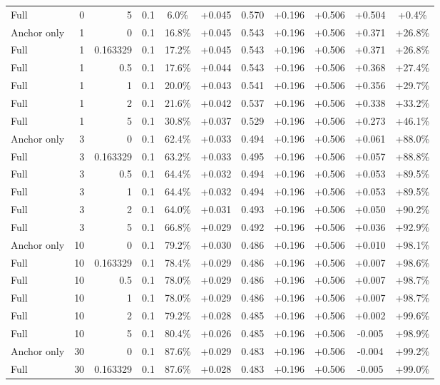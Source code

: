 \begin{table}[htbp]
\begin{tabular}{lrrrccccccc}
Full & 0 & 5 & 0.1 & 6.0\% & +0.045 & 0.570 & +0.196 & +0.506 & +0.504 & +0.4\% \\
Anchor only & 1 & 0 & 0.1 & 16.8\% & +0.045 & 0.543 & +0.196 & +0.506 & +0.371 & +26.8\% \\
Full & 1 & 0.163329 & 0.1 & 17.2\% & +0.045 & 0.543 & +0.196 & +0.506 & +0.371 & +26.8\% \\
Full & 1 & 0.5 & 0.1 & 17.6\% & +0.044 & 0.543 & +0.196 & +0.506 & +0.368 & +27.4\% \\
Full & 1 & 1 & 0.1 & 20.0\% & +0.043 & 0.541 & +0.196 & +0.506 & +0.356 & +29.7\% \\
Full & 1 & 2 & 0.1 & 21.6\% & +0.042 & 0.537 & +0.196 & +0.506 & +0.338 & +33.2\% \\
Full & 1 & 5 & 0.1 & 30.8\% & +0.037 & 0.529 & +0.196 & +0.506 & +0.273 & +46.1\% \\
Anchor only & 3 & 0 & 0.1 & 62.4\% & +0.033 & 0.494 & +0.196 & +0.506 & +0.061 & +88.0\% \\
Full & 3 & 0.163329 & 0.1 & 63.2\% & +0.033 & 0.495 & +0.196 & +0.506 & +0.057 & +88.8\% \\
Full & 3 & 0.5 & 0.1 & 64.4\% & +0.032 & 0.494 & +0.196 & +0.506 & +0.053 & +89.5\% \\
Full & 3 & 1 & 0.1 & 64.4\% & +0.032 & 0.494 & +0.196 & +0.506 & +0.053 & +89.5\% \\
Full & 3 & 2 & 0.1 & 64.0\% & +0.031 & 0.493 & +0.196 & +0.506 & +0.050 & +90.2\% \\
Full & 3 & 5 & 0.1 & 66.8\% & +0.029 & 0.492 & +0.196 & +0.506 & +0.036 & +92.9\% \\
Anchor only & 10 & 0 & 0.1 & 79.2\% & +0.030 & 0.486 & +0.196 & +0.506 & +0.010 & +98.1\% \\
Full & 10 & 0.163329 & 0.1 & 78.4\% & +0.029 & 0.486 & +0.196 & +0.506 & +0.007 & +98.6\% \\
Full & 10 & 0.5 & 0.1 & 78.0\% & +0.029 & 0.486 & +0.196 & +0.506 & +0.007 & +98.7\% \\
Full & 10 & 1 & 0.1 & 78.0\% & +0.029 & 0.486 & +0.196 & +0.506 & +0.007 & +98.7\% \\
Full & 10 & 2 & 0.1 & 79.2\% & +0.028 & 0.485 & +0.196 & +0.506 & +0.002 & +99.6\% \\
Full & 10 & 5 & 0.1 & 80.4\% & +0.026 & 0.485 & +0.196 & +0.506 & -0.005 & +98.9\% \\
Anchor only & 30 & 0 & 0.1 & 87.6\% & +0.029 & 0.483 & +0.196 & +0.506 & -0.004 & +99.2\% \\
Full & 30 & 0.163329 & 0.1 & 87.6\% & +0.028 & 0.483 & +0.196 & +0.506 & -0.005 & +99.0\% \\

\end{tabular}
\end{table}
